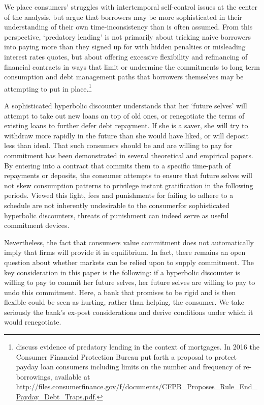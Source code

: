 \documentclass[11pt,english]{article}
\theoremstyle{plain}
\theoremstyle{definition}
\begin{document}
We place consumers' struggles with intertemporal self-control issues
at the center of the analysis, but argue that borrowers may be more
sophisticated in their understanding of their own time-inconsistency
than is often assumed. From this perspective, `predatory lending'
is not primarily about tricking naive borrowers into paying more than
they signed up for with hidden penalties or misleading interest rates
quotes, but about offering excessive flexibility and refinancing of
financial contracts in ways that limit or undermine the commitments
to long term consumption and debt management paths that borrowers
themselves may be attempting to put in place.\footnote{\citet{bond_predatory_2009} discuss evidence of predatory lending
in the context of mortgages. In 2016 the Consumer Financial Protection
Bureau put forth a proposal to protect payday loan consumers including
limits on the number and frequency of re-borrowings, available at
\url{http://files.consumerfinance.gov/f/documents/CFPB_Proposes_Rule_End_Payday_Debt_Traps.pdf}.}

A sophisticated hyperbolic discounter understands that her `future
selves' will attempt to take out new loans on top of old ones, or
renegotiate the terms of existing loans to further defer debt repayment.
If she is a saver, she will try to withdraw more rapidly in the future
than she would have liked, or will deposit less than ideal. That such
consumers should be and are willing to pay for commitment has been
demonstrated in several theoretical and empirical papers. By entering
into a contract that commits them to a specific time-path of repayments
or deposits, the consumer attempts to ensure that future selves will
not skew consumption patterns to privilege instant gratification in
the following periods. Viewed this light, fees and punishments for
failing to adhere to a schedule are not inherently undesirable to
the consumer\textendash for sophisticated hyperbolic discounters,
threats of punishment can indeed serve as useful commitment devices.

Nevertheless, the fact that consumers value commitment does not automatically
imply that firms will provide it in equilibrium. In fact, there remains
an open question about whether markets can be relied upon to supply
commitment. The key consideration in this paper is the following:
if a hyperbolic discounter is willing to pay to commit her future
selves, her future selves are willing to pay to undo this commitment.
Here, a bank that promises to be rigid and is then flexible could
be seen as hurting, rather than helping, the consumer. We take seriously
the bank's ex-post considerations and derive conditions under which
it would renegotiate.
\end{document}
